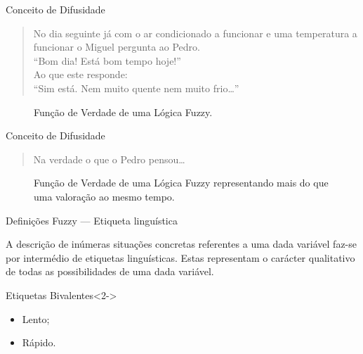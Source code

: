 \documentclass[portuges]{beamer}
\begin{document}
\begin{frame}{Conceito de Difusidade}
	\begin{quote}
		No dia seguinte já com o ar condicionado a funcionar e uma
		temperatura a funcionar o Miguel pergunta ao Pedro.\\
		``Bom dia! Está bom tempo hoje!''\\
		Ao que este responde:\\
		``Sim está. \alert{Nem muito quente nem muito frio}\ldots''  
	\end{quote}
	\begin{figure}
			\centering
			\caption{Função de Verdade de uma Lógica Fuzzy.}
	\end{figure}
\end{frame}

\begin{frame}{Conceito de Difusidade}
	\begin{quote}
		Na verdade o que o Pedro pensou\ldots
	\end{quote}
	\begin{figure}
			\centering
			\caption{Função de Verdade de uma Lógica Fuzzy representando mais do que uma valoração ao mesmo tempo.}
	\end{figure}
\end{frame}

\begin{frame}{Definições Fuzzy --- Etiqueta linguística}
	\begin{definition}
		A descrição de inúmeras situações concretas referentes a uma dada variável faz-se por intermédio de \alert{etiquetas
		linguísticas}. Estas representam o carácter \alert{qualitativo} de todas as possibilidades de uma dada variável.
	\end{definition}
	
	\begin{exampleblock}{Etiquetas Bivalentes}<2->
		\begin{itemize}
			\item Lento;
			\item Rápido.
		\end{itemize}	
	\end{exampleblock}
\end{frame}
\end{document}
